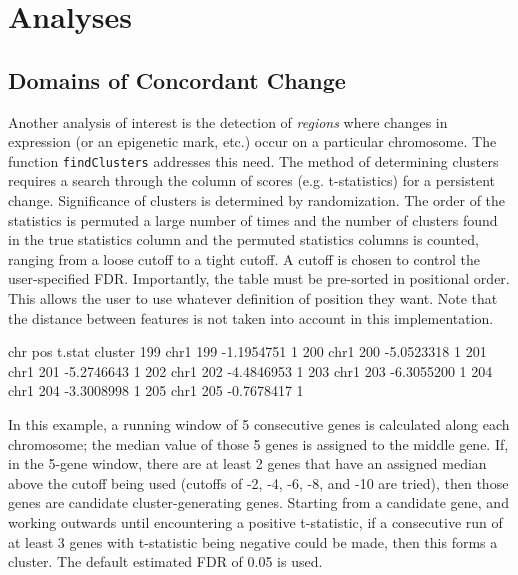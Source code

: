\documentclass[a4paper, 12pt]{article}
\begin{document}
\section{Analyses}


\subsection{Domains of Concordant Change}

Another analysis of interest is the detection of {\em regions} where changes in expression (or an epigenetic mark, etc.) occur on a particular chromosome. The function \texttt{findClusters} addresses this need. The method of determining clusters requires a search through the column of scores (e.g. t-statistics) for a persistent change.  Significance of clusters is determined by randomization.  The order of the statistics is permuted a large number of times and the number of clusters found in the true statistics column and the permuted statistics columns is counted, ranging from a loose cutoff to a tight cutoff.  A cutoff is chosen to control the user-specified FDR. Importantly, the table must be pre-sorted in positional order. This allows the user to use whatever definition of position they want.  Note that the distance between features is not taken into account in this implementation.

\begin{Schunk}
\begin{Soutput}
     chr pos     t.stat cluster
199 chr1 199 -1.1954751       1
200 chr1 200 -5.0523318       1
201 chr1 201 -5.2746643       1
202 chr1 202 -4.4846953       1
203 chr1 203 -6.3055200       1
204 chr1 204 -3.3008998       1
205 chr1 205 -0.7678417       1
\end{Soutput}
\end{Schunk}

\noindent In this example, a running window of 5 consecutive genes is calculated along each chromosome; the median value of those 5 genes is assigned to the middle gene. If, in the 5-gene window, there are at least 2 genes that have an assigned median above the cutoff being used (cutoffs of -2, -4, -6, -8, and -10 are tried), then those genes are candidate cluster-generating genes. Starting from a candidate gene, and working outwards until encountering a positive t-statistic, if a consecutive run of at least 3 genes with t-statistic being negative could be made, then this forms a cluster. The default estimated FDR of 0.05 is used.
\end{document}
